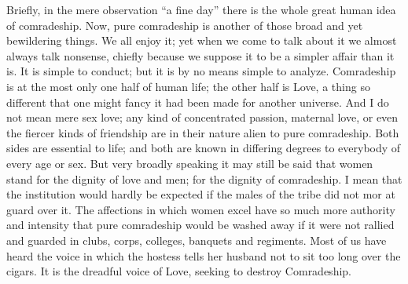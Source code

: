 \documentclass{book}
\begin{document}
Briefly, in the mere observation “a fine day” there is the whole great human idea of comradeship. Now, pure comradeship is another of those broad and yet bewildering things. We all enjoy it; yet when we come to talk about it we almost always talk nonsense, chiefly because we suppose it to be a simpler affair than it is. It is simple to conduct; but it is by no means simple to analyze. Comradeship is at the most only one half of human life; the other half is Love, a thing so different that one might fancy it had been made for another universe. And I do not mean mere sex love; any kind of concentrated passion, maternal love, or even the fiercer kinds of friendship are in their nature alien to pure comradeship. Both sides are essential to life; and both are known in differing degrees to everybody of every age or sex. But very broadly speaking it may still be said that women stand for the dignity of love and men; for the dignity of comradeship. I mean that the institution would hardly be expected if the males of the tribe did not mor at guard over it. The affections in which women excel have so much more authority and intensity that pure comradeship would be washed away if it were not rallied and guarded in clubs, corps, colleges, banquets and regiments. Most of us have heard the voice in which the hostess tells her husband not to sit too long over the cigars. It is the dreadful voice of Love, seeking to destroy Comradeship.
\end{document}
